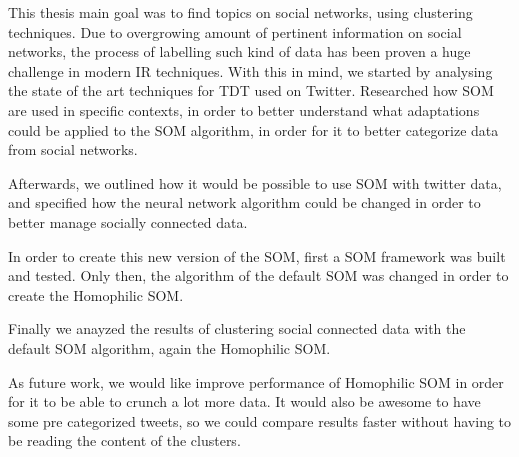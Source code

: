 \label{ch:conclusions}
This thesis main goal was to find topics on social networks, using clustering techniques. Due to overgrowing amount of pertinent information on social networks, the process of labelling such kind of data has been proven a huge challenge in modern \ac{IR} techniques. 
With this in mind, we started by analysing the state of the art techniques for \ac{TDT} used on Twitter. Researched how \ac{SOM} are used in specific contexts, in order to better understand what adaptations could be applied to the \ac{SOM} algorithm, in order for it to better categorize data from social networks.

Afterwards, we outlined how it would be possible to use \ac{SOM} with twitter data, and specified how the neural network algorithm could be changed in order to better manage socially connected data. 

In order to create this new version of the \ac{SOM}, first a \ac{SOM} framework was built and tested. Only then, the algorithm of the default \ac{SOM} was changed in order to create the Homophilic SOM.

Finally we anayzed the results of clustering social connected data with the default \ac{SOM} algorithm, again the Homophilic SOM.

As future work, we would like improve performance of Homophilic \ac{SOM} in order for it to be able to crunch a lot more data. It would also be awesome to have some pre categorized tweets, so we could compare results faster without having to be reading the content of the clusters.

\cleardoublepage
 
